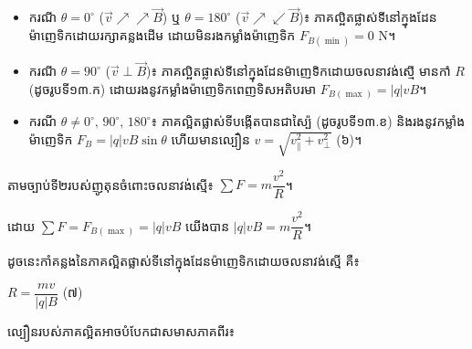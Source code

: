 \begin{itemize}[itemsep=2pt, topsep=4pt, parsep=0pt, leftmargin=1.6em]
	\item ករណី $\theta = 0^{\circ}$ ($\vec{v}\nearrow\nearrow \vec{B}$) ឬ $\theta = 180^{\circ}$ ($\vec{v}\nearrow\swarrow \vec{B}$)៖ ភាគល្អិតផ្លាស់ទីនៅក្នុងដែនម៉ាញេទិកដោយរក្សាគន្លងដើម ដោយមិនរងកម្លាំងម៉ាញេទិក $F_{B(\min)} = 0$ N។
	\item ករណី $\theta = 90^{\circ}$ ($\vec{v}\perp\vec{B}$)៖ ភាគល្អិតផ្លាស់ទីនៅក្នុងដែនម៉ាញេទិកដោយចលនាវង់ស្មើ មានកាំ $R$ (ដូចរូបទី១៣.ក) ដោយរងនូវកម្លាំងម៉ាញេទិកពេញទិសអតិបរមា $F_{B(\max)} = |q|vB$។
	\item ករណី $\theta \neq 0^{\circ},\, 90^{\circ},\, 180^{\circ}$៖ ភាគល្អិតផ្លាស់ទីបង្កើតបានជាស្ប៉ៃ (ដូចរូបទី១៣.ខ) និងរងនូវកម្លាំងម៉ាញេទិក $F_B = |q|vB\sin\theta$ ហើយមានល្បឿន $\boxed{v = \sqrt{v_\parallel^2 + v_\perp^2}}$ (៦)។
\end{itemize}

\vspace{0.5em}
\noindent
តាមច្បាប់ទី២របស់ញូតុនចំពោះចលនាវង់ស្មើ៖ $\sum F = m\dfrac{v^2}{R}$។

\vspace{0.3em}
ដោយ $\sum F = F_{B(\max)} = |q|vB$ យើងបាន $|q|vB = m\dfrac{v^2}{R}$។

\vspace{0.7em}
\noindent
{}

\vspace{0.5em}
ដូចនេះកាំគន្លងនៃភាគល្អិតផ្លាស់ទីនៅក្នុងដែនម៉ាញេទិកដោយចលនាវង់ស្មើ គឺ៖

\begin{center}
	$\boxed{R = \dfrac{mv}{|q|B}}$ \quad (៧)
\end{center}

\vspace{0.4em}

\vspace{0.9em}
\noindent
ល្បឿនរបស់ភាគល្អិតអាចបំបែកជាសមាសភាគពីរ៖

